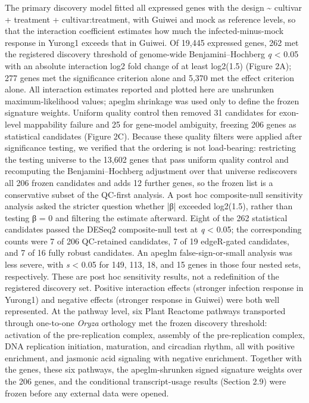 \documentclass[12pt,letterpaper]{article}
\begin{document}
The primary discovery model fitted all expressed genes with the design \textasciitilde{} cultivar + treatment + cultivar:treatment, with Guiwei and mock as reference levels, so that the interaction coefficient estimates how much the infected-minus-mock response in Yurong1 exceeds that in Guiwei. Of 19,445 expressed genes, 262 met the registered discovery threshold of genome-wide Benjamini–Hochberg \textit{q} < 0.05 with an absolute interaction log2 fold change of at least log2(1.5) (Figure 2A); 277 genes met the significance criterion alone and 5,370 met the effect criterion alone. All interaction estimates reported and plotted here are unshrunken maximum-likelihood values; apeglm shrinkage was used only to define the frozen signature weights. Uniform quality control then removed 31 candidates for exon-level mappability failure and 25 for gene-model ambiguity, freezing 206 genes as statistical candidates (Figure 2C). Because these quality filters were applied after significance testing, we verified that the ordering is not load-bearing: restricting the testing universe to the 13,602 genes that pass uniform quality control and recomputing the Benjamini–Hochberg adjustment over that universe rediscovers all 206 frozen candidates and adds 12 further genes, so the frozen list is a conservative subset of the QC-first analysis. A post hoc composite-null sensitivity analysis asked the stricter question whether |β| exceeded log2(1.5), rather than testing β = 0 and filtering the estimate afterward. Eight of the 262 statistical candidates passed the DESeq2 composite-null test at \textit{q} < 0.05; the corresponding counts were 7 of 206 QC-retained candidates, 7 of 19 edgeR-gated candidates, and 7 of 16 fully robust candidates. An apeglm false-sign-or-small analysis was less severe, with \textit{s} < 0.05 for 149, 113, 18, and 15 genes in those four nested sets, respectively. These are post hoc sensitivity results, not a redefinition of the registered discovery set. Positive interaction effects (stronger infection response in Yurong1) and negative effects (stronger response in Guiwei) were both well represented. At the pathway level, six Plant Reactome pathways transported through one-to-one \textit{Oryza} orthology met the frozen discovery threshold: activation of the pre-replication complex, assembly of the pre-replication complex, DNA replication initiation, maturation, and circadian rhythm, all with positive enrichment, and jasmonic acid signaling with negative enrichment. Together with the genes, these six pathways, the apeglm-shrunken signed signature weights over the 206 genes, and the conditional transcript-usage results (Section 2.9) were frozen before any external data were opened.
\end{document}
